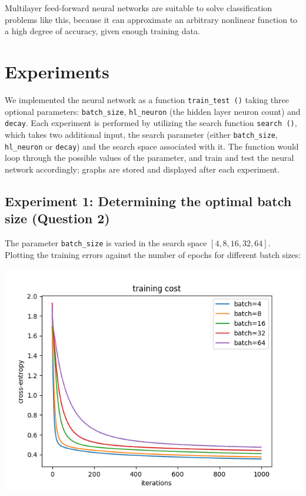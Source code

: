 Multilayer feed-forward neural networks are suitable to solve classification
problems like this, because it can approximate an arbitrary nonlinear
function to a high degree of accuracy, given enough training data.

\section*{Experiments}

We implemented the neural network as a function \texttt{train\_test\,()}
taking three optional parameters: 
\texttt{batch\_size}, \texttt{hl\_neuron} (the hidden layer neuron count) and
\texttt{decay}. Each experiment is performed by utilizing the search function
\texttt{search\,()}, which takes two additional input, the search parameter
(either \texttt{batch\_size}, \texttt{hl\_neuron} or \texttt{decay}) and the
search space associated with it. The function would loop through the possible
values of the parameter, and train and test the neural network accordingly;
graphs are stored and displayed after each experiment.

\subsection*{Experiment 1: Determining the optimal batch size (Question 2)}

The parameter \texttt{batch\_size} is varied in the search space
\([4,8,16,32,64]\).
Plotting the training errors against the number of epochs for different
batch sizes:

\begin{center}
    \includegraphics[width=\imgw]{images/p1a2_batch_cost.png}   
\end{center}


